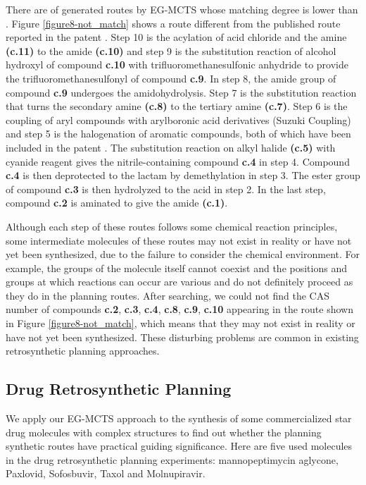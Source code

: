 \documentclass[sn-mathphys,Numbered]{sn-jnl}
\begin{document}
There are  of  generated routes by EG-MCTS whose matching degree is lower than . Figure \ref{figure8-not_match} shows a route different from the published route reported in the patent \citep{paten-notsame}.
Step 10 is the acylation of acid chloride and the amine \textbf{(c.11)} to the amide \textbf{(c.10)} and step 9 is the substitution reaction of alcohol hydroxyl of compound \textbf{c.10} with trifluoromethanesulfonic anhydride to provide the trifluoromethanesulfonyl of compound \textbf{c.9}. 
In step 8, the amide group of compound \textbf{c.9} undergoes the amidohydrolysis. 
Step 7 is the substitution reaction that turns the secondary amine \textbf{(c.8)} to the tertiary amine \textbf{(c.7)}.
Step 6 is the coupling of aryl compounds with arylboronic acid derivatives (Suzuki Coupling) and step 5 is the halogenation of aromatic compounds, both of which have been included in the patent \citep{paten2}. 
The substitution reaction on alkyl halide \textbf{(c.5)} with cyanide reagent gives the nitrile-containing compound \textbf{c.4} in step 4. 
Compound \textbf{c.4} is then deprotected to the lactam by demethylation in step 3. 
The ester group of compound \textbf{c.3} is then hydrolyzed to the acid in step 2. 
In the last step, compound \textbf{c.2} is aminated to give the amide \textbf{(c.1)}.

Although each step of these routes follows some chemical reaction principles, some intermediate molecules of these routes may not exist in reality or have not yet been synthesized, due to the failure to consider the chemical environment. For example, the groups of the molecule itself cannot coexist and the positions and groups at which reactions can occur are various and do not definitely proceed as they do in the planning routes. After searching, we could not find the CAS number of compounds \textbf{c.2}, \textbf{c.3}, \textbf{c.4}, \textbf{c.8}, \textbf{c.9}, \textbf{c.10} appearing in the route shown in Figure \ref{figure8-not_match}, which means that they may not exist in reality or have not yet been synthesized. These disturbing problems are common in existing retrosynthetic planning approaches.



\subsection{Drug Retrosynthetic Planning}

We apply our EG-MCTS approach to the synthesis of some commercialized star drug molecules with complex structures to find out whether the planning synthetic routes have practical guiding significance. Here are five used molecules in the drug retrosynthetic planning experiments: mannopeptimycin aglycone, Paxlovid, Sofosbuvir, Taxol and Molnupiravir.
\end{document}

